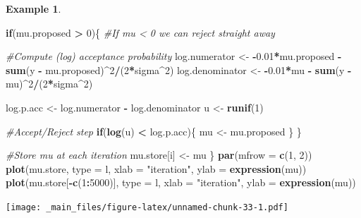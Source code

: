 \documentclass[
]{book}
\newenvironment{Shaded}{\begin{snugshade}}{\end{snugshade}}
\newcommand{\AttributeTok}[1]{\textcolor[rgb]{0.13,0.29,0.53}{#1}}
\newcommand{\CommentTok}[1]{\textcolor[rgb]{0.56,0.35,0.01}{\textit{#1}}}
\newcommand{\ControlFlowTok}[1]{\textcolor[rgb]{0.13,0.29,0.53}{\textbf{#1}}}
\newcommand{\DecValTok}[1]{\textcolor[rgb]{0.00,0.00,0.81}{#1}}
\newcommand{\FloatTok}[1]{\textcolor[rgb]{0.00,0.00,0.81}{#1}}
\newcommand{\FunctionTok}[1]{\textcolor[rgb]{0.13,0.29,0.53}{\textbf{#1}}}
\newcommand{\NormalTok}[1]{#1}
\newcommand{\OtherTok}[1]{\textcolor[rgb]{0.56,0.35,0.01}{#1}}
\newcommand{\SpecialCharTok}[1]{\textcolor[rgb]{0.81,0.36,0.00}{\textbf{#1}}}
\newcommand{\StringTok}[1]{\textcolor[rgb]{0.31,0.60,0.02}{#1}}
\theoremstyle{definition}
\theoremstyle{definition}
\newtheorem{example}{Example}[chapter]
\theoremstyle{definition}
\theoremstyle{definition}
\theoremstyle{remark}
\begin{document}
\begin{example}
\begin{Shaded}
\begin{Highlighting}[]
  \ControlFlowTok{if}\NormalTok{(mu.proposed }\SpecialCharTok{\textgreater{}} \DecValTok{0}\NormalTok{)\{ }\CommentTok{\#If mu \textless{} 0 we can reject straight away}
    
    \CommentTok{\#Compute (log) acceptance probability}
\NormalTok{    log.numerator   }\OtherTok{\textless{}{-}} \SpecialCharTok{{-}}\FloatTok{0.01}\SpecialCharTok{*}\NormalTok{mu.proposed }\SpecialCharTok{{-}}
                        \FunctionTok{sum}\NormalTok{(y }\SpecialCharTok{{-}}\NormalTok{ mu.proposed)}\SpecialCharTok{\^{}}\DecValTok{2}\SpecialCharTok{/}\NormalTok{(}\DecValTok{2}\SpecialCharTok{*}\NormalTok{sigma}\SpecialCharTok{\^{}}\DecValTok{2}\NormalTok{)}
\NormalTok{    log.denominator }\OtherTok{\textless{}{-}} \SpecialCharTok{{-}}\FloatTok{0.01}\SpecialCharTok{*}\NormalTok{mu }\SpecialCharTok{{-}} \FunctionTok{sum}\NormalTok{(y }\SpecialCharTok{{-}}\NormalTok{ mu)}\SpecialCharTok{\^{}}\DecValTok{2}\SpecialCharTok{/}\NormalTok{(}\DecValTok{2}\SpecialCharTok{*}\NormalTok{sigma}\SpecialCharTok{\^{}}\DecValTok{2}\NormalTok{)}
    
\NormalTok{    log.p.acc }\OtherTok{\textless{}{-}}\NormalTok{ log.numerator }\SpecialCharTok{{-}}\NormalTok{ log.denominator}
\NormalTok{    u }\OtherTok{\textless{}{-}} \FunctionTok{runif}\NormalTok{(}\DecValTok{1}\NormalTok{)}
    
    \CommentTok{\#Accept/Reject step}
    \ControlFlowTok{if}\NormalTok{(}\FunctionTok{log}\NormalTok{(u) }\SpecialCharTok{\textless{}}\NormalTok{ log.p.acc)\{}
\NormalTok{      mu }\OtherTok{\textless{}{-}}\NormalTok{ mu.proposed}
\NormalTok{    \}}
\NormalTok{  \}}
  
  \CommentTok{\#Store mu at each iteration}
\NormalTok{  mu.store[i] }\OtherTok{\textless{}{-}}\NormalTok{ mu}
\NormalTok{\}}
\FunctionTok{par}\NormalTok{(}\AttributeTok{mfrow =} \FunctionTok{c}\NormalTok{(}\DecValTok{1}\NormalTok{, }\DecValTok{2}\NormalTok{))}
\FunctionTok{plot}\NormalTok{(mu.store, }\AttributeTok{type =} \StringTok{\textquotesingle{}l\textquotesingle{}}\NormalTok{, }\AttributeTok{xlab =} \StringTok{"iteration"}\NormalTok{, }\AttributeTok{ylab =} \FunctionTok{expression}\NormalTok{(mu))}
\FunctionTok{plot}\NormalTok{(mu.store[}\SpecialCharTok{{-}}\FunctionTok{c}\NormalTok{(}\DecValTok{1}\SpecialCharTok{:}\DecValTok{5000}\NormalTok{)], }\AttributeTok{type =} \StringTok{\textquotesingle{}l\textquotesingle{}}\NormalTok{, }\AttributeTok{xlab =} \StringTok{"iteration"}\NormalTok{,}
     \AttributeTok{ylab =} \FunctionTok{expression}\NormalTok{(mu))}
\end{Highlighting}
\end{Shaded}

\texttt{[image: \_main\_files/figure-latex/unnamed-chunk-33-1.pdf]}
\end{example}
\end{document}
